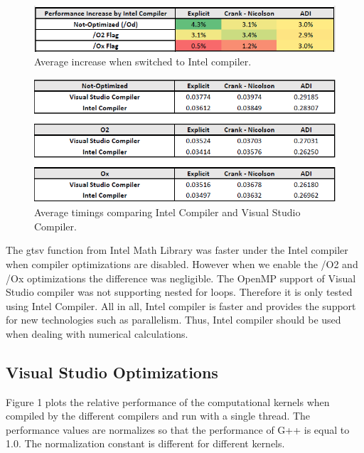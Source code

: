 \documentclass[12pt, oneside]{book}
\theoremstyle{plain}
\theoremstyle{definition}
\begin{document}
\begin{figure}[!htb]
    \centering
        \includegraphics[scale=0.8]{compilerPercent.png}
    \caption{Average increase when switched to Intel compiler.}
\end{figure}

\begin{figure}[!htb]
    \centering
        \includegraphics[scale=0.8]{compilerT.png}
    \caption{Average timings comparing Intel Compiler and Visual Studio Compiler.}
\end{figure}


The gtsv function from Intel Math Library was faster under the Intel compiler when compiler optimizations are disabled. However when we enable the /O2 and /Ox optimizations the difference was negligible. The OpenMP support of Visual Studio compiler was not supporting nested for loops. Therefore it is only tested using Intel Compiler. All in all, Intel compiler is faster and provides the support for new technologies such as parallelism. Thus, Intel compiler should be used when dealing with numerical calculations.

\subsection{Visual Studio Optimizations}
Figure 1 plots the relative performance of the computational kernels when compiled by the different compilers and run with a single thread. The performance values are normalizes so that the performance of G++ is equal to 1.0. The normalization constant is different for different kernels.
\end{document}
